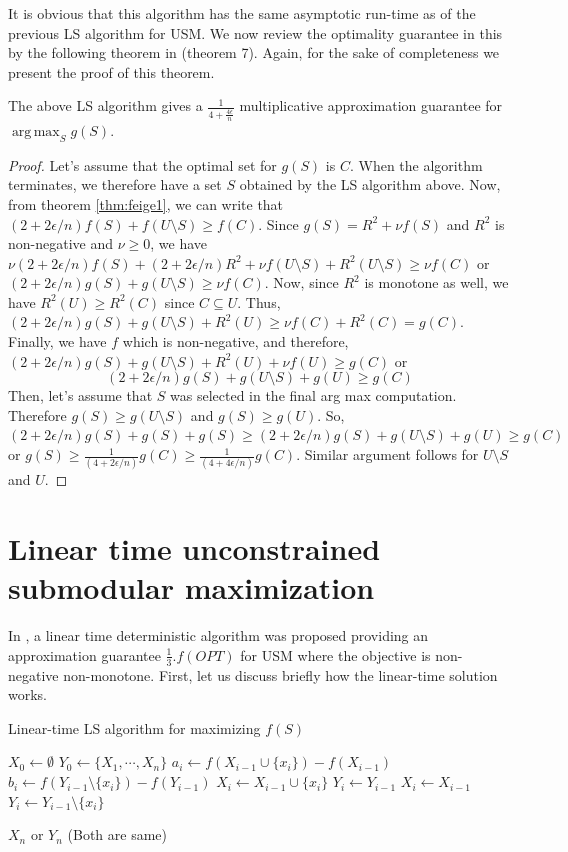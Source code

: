 \noindent It is obvious that this algorithm has the same asymptotic run-time as of the previous LS algorithm for USM. We now review the optimality guarantee in this by the following theorem in \citealp{NIPS2012_4689} (theorem 7). Again, for the sake of completeness we present the proof of this theorem.

\begin{theorem}
\label{thm:usmgdas}
 The above LS algorithm gives a $\frac{1}{4+\frac{4\epsilon}{n}}$ multiplicative approximation guarantee for $\operatorname*{arg\,max}_{S} g(S)$.
\end{theorem}
\begin{proof}
 Let's assume that the optimal set for $g(S)$ is $C$. When the algorithm terminates, we therefore have a set $S$ obtained by the LS algorithm above. Now, from theorem \ref{thm:feige1}, we can write that $(2+2\epsilon/n)f(S)+f(U\setminus S)\ge f(C)$. Since $g(S)=R^2+\nu f(S)$ and $R^2$ is non-negative and $\nu\ge 0$, we have $\nu (2+2\epsilon/n)f(S)+(2+2\epsilon/n)R^2+\nu f(U\setminus S)+R^2(U\setminus S)\ge \nu f(C)$ or $(2+2\epsilon/n)g(S)+g(U\setminus S)\ge \nu f(C)$. Now, since $R^2$ is monotone as well, we have $R^2(U)\ge R^2(C)$ since $C\subseteq U$. Thus, $(2+2\epsilon/n)g(S)+g(U\setminus S)+R^2(U)\ge \nu f(C)+R^2(C)=g(C)$. Finally, we have $f$ which is non-negative, and therefore, $(2+2\epsilon/n)g(S)+g(U\setminus S)+R^2(U)+\nu f(U)\ge g(C)$ or 
 \[(2+2\epsilon/n)g(S)+g(U\setminus S)+g(U)\ge g(C)\]
 Then, let's assume that $S$ was selected in the final arg max computation. Therefore $g(S)\ge g(U\setminus S)$ and $g(S)\ge g(U)$. So, $(2+2\epsilon/n)g(S)+g(S)+g(S)\ge (2+2\epsilon/n)g(S)+g(U\setminus S)+g(U)\ge g(C)$ or $g(S)\ge \frac{1}{(4+2\epsilon/n)}g(C)\ge \frac{1}{(4+4\epsilon/n)}g(C)$. Similar argument follows for $U\setminus S$ and $U$.
\end{proof}

\section{Linear time unconstrained submodular maximization}
\label{section:lusm}
In \citealp{Buchbinder:2012:TLT:2417500.2417835}, a linear time deterministic algorithm was proposed providing an approximation guarantee $\frac{1}{3}.f(OPT)$ for USM where the objective is non-negative non-monotone. First, let us discuss briefly how the linear-time solution works.

\begin{algorithm}
Linear-time LS algorithm for maximizing $f(S)$
\begin{algorithmic}[1]
\State $X_0\gets \emptyset$
\State $Y_0\gets \{X_1,\cdots,X_n\}$
  \State $a_i\gets f(X_{i-1}\cup\{x_i\})-f(X_{i-1})$
  \State $b_i\gets f(Y_{i-1}\setminus\{x_i\})-f(Y_{i-1})$
    \State $X_i\gets X_{i-1}\cup\{x_i\}$
    \State $Y_i\gets Y_{i-1}$
  \Else
    \State $X_i\gets X_{i-1}$
    \State $Y_i\gets Y_{i-1}\setminus \{x_i\}$
  \EndIf
\EndFor
\end{algorithmic}
\Return $X_n$ or $Y_n$ (Both are same)
\end{algorithm}

